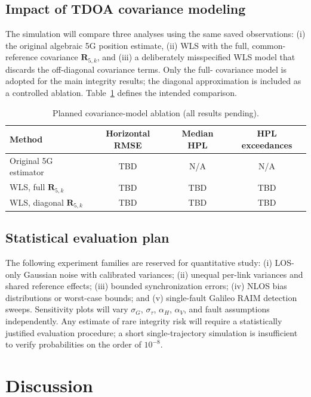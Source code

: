 \documentclass[pdflatex,sn-mathphys-num]{sn-jnl}
\newcommand{\mat}[1]{\mathbf{#1}}
\begin{document}
\subsection{Impact of TDOA covariance modeling}

The simulation will compare three analyses using the same saved
observations: (i) the original algebraic 5G position estimate,
(ii) WLS with the full, common-reference covariance
$\mat{R}_{5,k}$, and (iii) a deliberately misspecified WLS model
that discards the off-diagonal covariance terms. Only the full-
covariance model is adopted for the main integrity results; the
diagonal approximation is included as a controlled ablation.
Table~\ref{tab:cov-ablation} defines the intended comparison.

\begin{table}[t]
\caption{Planned covariance-model ablation (all results pending).}
\label{tab:cov-ablation}
\begin{tabular}{@{}lccc@{}}
\toprule
Method & Horizontal RMSE & Median HPL & HPL exceedances\\
\midrule
Original 5G estimator & TBD & N/A & N/A\\
WLS, full $\mat{R}_{5,k}$ & TBD & TBD & TBD\\
WLS, diagonal $\mat{R}_{5,k}$ & TBD & TBD & TBD\\
\bottomrule
\end{tabular}
\end{table}

\subsection{Statistical evaluation plan}

The following experiment families are reserved for quantitative study:
(i) LOS-only Gaussian noise with calibrated variances; (ii) unequal
per-link variances and shared reference effects; (iii) bounded
synchronization errors; (iv) NLOS bias distributions or worst-case
bounds; and (v) single-fault Galileo RAIM detection sweeps. Sensitivity
plots will vary $\sigma_G$, $\sigma_\tau$, $\alpha_H$,
$\alpha_V$, and fault assumptions independently. Any estimate of
rare integrity risk will require a statistically justified evaluation
procedure; a short single-trajectory simulation is insufficient to
verify probabilities on the order of $10^{-8}$.

\section{Discussion}\label{sec:discussion}
\end{document}
